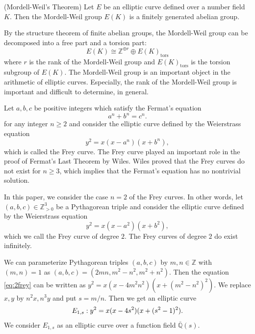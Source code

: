 \documentclass[main]{subfiles}
\begin{document}
\begin{thm}{(Mordell-Weil's Theorem)}
    \label{thm:mordell}
    Let $E$ be an elliptic curve defined over a number field $K$.
    Then the Mordell-Weil group $E(K)$ is a finitely generated abelian group.
\end{thm}
By the structure theorem of finite abelian groups, the Mordell-Weil group can be decomposed into a free part and a torsion part:
\begin{equation*}
    E(K) \cong \mathbb{Z}^{\oplus r} \oplus E(K)_{\text{tors}}
\end{equation*}
where $r$ is the rank of the Mordell-Weil group and $E(K)_{\text{tors}}$ is the torsion subgroup of $E(K)$.
The Mordell-Weil group is an important object in the arithmetic of elliptic curves.
Especially, the rank of the Mordell-Weil group is important and difficult to determine, in general.

Let $a,b,c$ be positive integers which satisfy the Fermat's equation
\begin{equation*}
    a^{n} + b^{n} = c^{n}.
\end{equation*}
for any integer $n \geq 2$ and consider the elliptic curve defined by the Weierstrass equation
\begin{equation*}
    y^{2} = x(x - a^{n})(x + b^{n}),
\end{equation*}
which is called the Frey curve.
The Frey curve played an important role in the proof of Fermat's Last Theorem by Wiles.
Wiles proved that the Frey curves do not exist for $n \geq 3$, which implies that the Fermat's equation has no nontrivial solution.

In this paper, we consider the case $n=2$ of the Frey curves.
In other words, let $(a,b,c) \in \mathbb{Z}_{> 0}^3$ be a Pythagorean triple and consider the elliptic curve defined by the Weierstrass equation
\begin{equation}
    \label{eq:2frey}
    y^{2} = x(x - a^{2})(x + b^{2}),
\end{equation}
which we call the Frey curve of degree $2$.
The Frey curves of degree $2$ do exist infinitely.

We can parameterize Pythagorean triples $(a,b,c)$ by $m,n \in \mathbb{Z}$ with $(m,n)=1$ as $(a,b,c) = (2mn, m^{2} - n^{2}, m^{2} + n^{2})$.
Then the equation \eqref{eq:2frey} can be written as $y^{2} = x(x - 4m^2n^2)(x + (m^{2} - n^2)^{2})$.
We replace $x,y$ by $n^2x, n^3y$ and put $s = m/n$.
Then we get an elliptic curve
\begin{equation}
    \label{eq:E_{1,s}}
    E_{1,s}: y^{2} = x(x - 4s^{2})(x + (s^{2} - 1)^{2}).
\end{equation}
We consider $E_{1,s}$ as an elliptic curve over a function field $\overline{\mathbb{Q}}(s)$.
\end{document}
